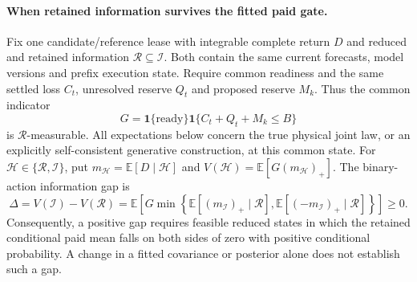 \paragraph{When retained information survives the fitted paid gate.}
Fix one candidate/reference lease with integrable complete return $D$ and
reduced and retained information $\mathcal R\subseteq\mathcal I$.
Both contain the same current forecasts, model versions and prefix execution
state.  Require common readiness and the same settled loss $C_t$, unresolved
reserve $Q_t$ and proposed reserve $M_k$.  Thus the common indicator
\begin{equation}
 G=\mathbf1\{\text{ready}\}\mathbf1\{C_t+Q_t+M_k\leq B\}
 \label{eq:final-paid-common-feasibility}
\end{equation}
is $\mathcal R$-measurable.  All expectations below concern the true physical
joint law, or an explicitly self-consistent generative construction, at this
common state.  For $\mathcal H\in\{\mathcal R,\mathcal I\}$, put
$m_{\mathcal H}=\mathbb E[D\mid\mathcal H]$ and
$V(\mathcal H)=\mathbb E[G(m_{\mathcal H})_+]$.
The binary-action information gap is
\begin{equation}
 \Delta=V(\mathcal I)-V(\mathcal R)
 =\mathbb E\!\left[G\min\!\left\{
 \mathbb E[(m_{\mathcal I})_+\mid\mathcal R],
 \mathbb E[(-m_{\mathcal I})_+\mid\mathcal R]\right\}\right]\geq0.
 \label{eq:final-paid-information-gap}
\end{equation}
Consequently, a positive gap requires feasible reduced states in which the
retained conditional paid mean falls on both sides of zero with positive
conditional probability.  A change in a fitted covariance or posterior
alone does not establish such a gap.

